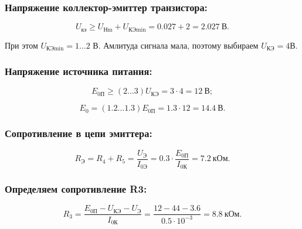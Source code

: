   \subsubsection{Напряжение коллектор-эмиттер транзистора:}  

  \begin{equation}
  \label{eq:equation6_4}
    U_{\text{кэ}} \geq U_{\text{Нm}} + U_{\text{КЭmin}} = 0.027+2 = 2.027~\text{В}.
  \end{equation}   

  При этом $U_{\text{КЭmin}} = 1 \ldots 2$ В.
  Амлитуда сигнала мала, поэтому выбираем $U_{\text{КЭ}} = 4 $В.

  \subsubsection{Напряжение источника питания:}  

  \begin{equation}
  \label{eq:equation6_5}
    E_{\text{0П}} \geq (2 \ldots 3) U_{\text{КЭ}} = 3 \cdot 4 = 12~\text{В};
  \end{equation} 

  \begin{equation}
  \label{eq:equation6_6}
    E_{\text{0}} = (1.2 \ldots 1.3) E_{\text{0П}} = 1.3 \cdot 12 = 14.4~\text{В}.
  \end{equation} 

  \subsubsection{Сопротивление в цепи эмиттера:}  
  
  \begin{equation}
  \label{eq:equation6_7}
    R_{\text{Э}} = R_4 + R_5 = \dfrac{U_{\text{Э}}}{I_{\text{0Э}}} = 0.3 \cdot \dfrac{E_{\text{0П}}}{I_{\text{0К}}} = 7.2~\text{кОм}.
  \end{equation}

  \subsubsection{Определяем сопротивление R3:} %

  \begin{equation}
  \label{eq:equation6_8}
    R_3 = \dfrac{ E_{\text{0П}} - U_{\text{КЭ}} - U_{\text{Э}}}{I_{\text{0К}}} = \dfrac{12- 44 -3.6}{0.5\cdot 10^{-3}} = 8.8~\text{кОм}.
  \end{equation}

